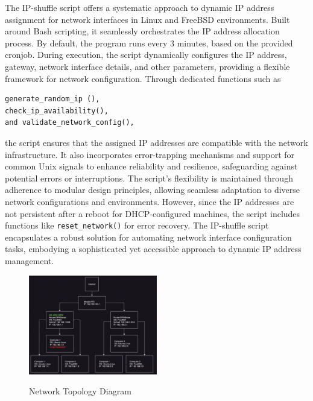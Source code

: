 The IP-shuffle script offers a systematic approach to dynamic IP address assignment for network interfaces in Linux and FreeBSD environments. Built around Bash scripting, it seamlessly orchestrates the IP address allocation process. By default, the program runs every 3 minutes, based on the provided cronjob. During execution, the script dynamically configures the IP address, gateway, network interface details, and other parameters, providing a flexible framework for network configuration. Through dedicated functions such as
\begin{verbatim}
generate_random_ip (), 
check_ip_availability(), 
and validate_network_config(), 
\end{verbatim}
the script ensures that the assigned IP addresses are compatible with the network infrastructure. It also incorporates error-trapping mechanisms and support for common Unix signals to enhance reliability and resilience, safeguarding against potential errors or interruptions. The script's flexibility is maintained through adherence to modular design principles, allowing seamless adaptation to diverse network configurations and environments. However, since the IP addresses are not persistent after a reboot for DHCP-configured machines, the script includes functions like \texttt{reset\_network()} for error recovery. The IP-shuffle script encapsulates a robust solution for automating network interface configuration tasks, embodying a sophisticated yet accessible approach to dynamic IP address management.

\label{sec:figs}


\begin{figure}
 \caption{Network Topology Diagram}
  \centering
   \includegraphics[width=0.5\textwidth]{diagram.png}
   \label{fig:network-topology}
\end{figure}

 




